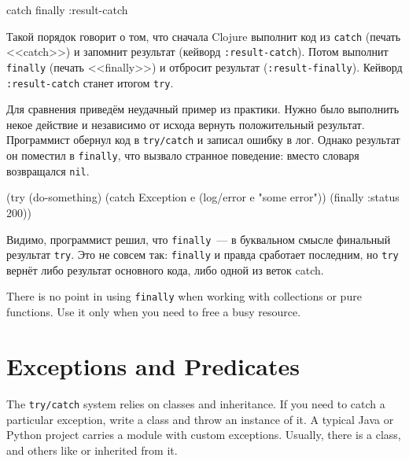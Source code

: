 \begin{english}
  \begin{clojure}
catch
finally
:result-catch
  \end{clojure}
\end{english}

Такой порядок говорит о том, что сначала Clojure выполнит код из \verb|catch|
(печать <<catch>>) и запомнит результат (кейворд \verb|:result-catch|). Потом выполнит
\verb|finally| (печать <<finally>>) и отбросит результат
(\verb|:result-finally|). Кейворд \verb|:result-catch| станет итогом \verb|try|.

Для сравнения приведём неудачный пример из практики. Нужно было выполнить некое
действие и независимо от исхода вернуть положительный результат. Программист
обернул код в \verb|try/catch| и записал ошибку в лог. Однако результат он
поместил в \verb|finally|, что вызвало странное поведение: вместо словаря
возвращался \verb|nil|.

\begin{english}
  \begin{clojure}
(try
  (do-something)
  (catch Exception e
    (log/error e "some error"))
  (finally
    {:status 200}))
  \end{clojure}
\end{english}

Видимо, программист решил, что \verb|finally|~--- в буквальном смысле финальный
результат \verb|try|. Это не совсем так: \verb|finally| и правда сработает
последним, но \verb|try| вернёт либо результат основного кода, либо одной из
веток catch.


There is no point in using \verb|finally| when working with collections or pure functions. Use it only when you need to free a busy resource.

\section{Exceptions and Predicates}


The \verb|try/catch| system relies on classes and inheritance. If you need to catch a particular exception, write a class and throw an instance of it. A typical Java or Python project carries a module with custom exceptions. Usually, there is a  class, and others like  or  inherited from it.

